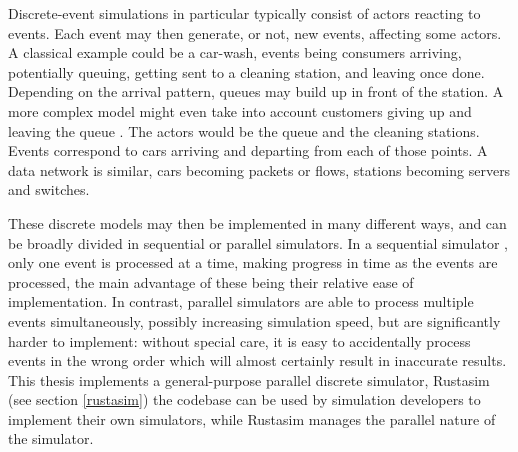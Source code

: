 Discrete-event simulations in particular typically consist of actors reacting to events.
Each event may then generate, or not,  new events, affecting some actors.
A classical example could be a car-wash, events being consumers arriving, potentially queuing, getting sent to a cleaning station, and leaving once done.
Depending on the arrival pattern, queues may build up in front of the station.  A more complex model might even take into account customers giving up and leaving the queue \cite{chandy_distributed_1979}.
The actors would be the queue and the cleaning stations.
Events correspond to cars arriving and departing from each of those points.
A data network is similar, cars becoming packets or flows, stations becoming servers and switches.

These discrete models may then be implemented in many different ways, and can be broadly divided in sequential or parallel simulators.
In a sequential simulator , only one event is processed at a time, making progress in time as the events are processed, the main advantage of these being their relative ease of implementation.
In contrast, parallel simulators  are able to process multiple events simultaneously, possibly increasing simulation speed, but are significantly harder to implement: without special care, it is easy to accidentally process events in the wrong order which will almost certainly result in inaccurate results.
This thesis implements a general-purpose parallel discrete simulator, Rustasim (see section \ref{rustasim})   the codebase can be used by simulation developers to implement their own simulators, while Rustasim manages the parallel nature of the simulator.

